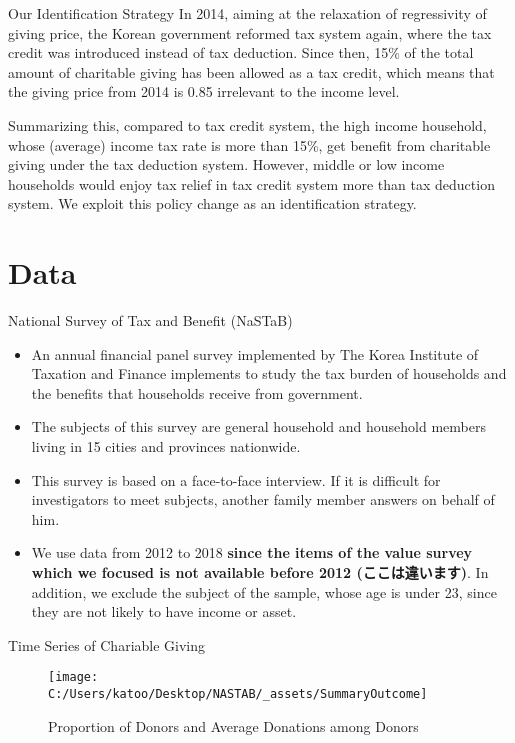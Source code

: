 \documentclass[
  ignorenonframetext,
]{beamer}
\providecommand{\tightlist}{%
  \setlength{\itemsep}{0pt}\setlength{\parskip}{0pt}}
\begin{document}
\begin{frame}{Our Identification Strategy}
\protect\hypertarget{our-identification-strategy}{}
In 2014, aiming at the relaxation of regressivity of giving price, the Korean government reformed tax system again, where the tax credit was introduced instead of tax deduction. Since then, 15\% of the total amount of charitable giving has been allowed as a tax credit, which means that the giving price from 2014 is 0.85 irrelevant to the income level.

Summarizing this, compared to tax credit system, the high income household, whose (average) income tax rate is more than 15\%, get benefit from charitable giving under the tax deduction system. However, middle or low income households would enjoy tax relief in tax credit system more than tax deduction system. We exploit this policy change as an identification strategy.
\end{frame}

\hypertarget{data}{%
\section{Data}\label{data}}

\begin{frame}{National Survey of Tax and Benefit (NaSTaB)}
\protect\hypertarget{national-survey-of-tax-and-benefit-nastab}{}
\begin{itemize}
\tightlist
\item
  An annual financial panel survey implemented by The Korea Institute of Taxation and Finance implements to study the tax burden of households and the benefits that households receive from government.
\item
  The subjects of this survey are general household and household members living in 15 cities and provinces nationwide.
\item
  This survey is based on a face-to-face interview. If it is difficult for investigators to meet subjects, another family member answers on behalf of him.
\item
  We use data from 2012 to 2018 \textbf{since the items of the value survey which we focused is not available before 2012 (ここは違います)}. In addition, we exclude the subject of the sample, whose age is under 23, since they are not likely to have income or asset.
\end{itemize}
\end{frame}

\begin{frame}{Time Series of Chariable Giving}
\protect\hypertarget{time-series-of-chariable-giving}{}
\begin{figure}

{\centering \texttt{[image: C:/Users/katoo/Desktop/NASTAB/\_assets/SummaryOutcome]} 

}

\caption{Proportion of Donors and Average Donations among Donors}\label{fig:figDonationRate}
\end{figure}
\end{frame}
\end{document}
